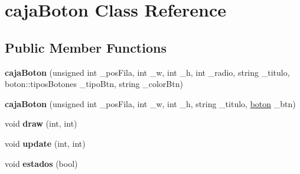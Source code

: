 \hypertarget{classcaja_boton}{}\section{caja\+Boton Class Reference}
\label{classcaja_boton}
\subsection*{Public Member Functions}
\begin{DoxyCompactItemize}
\item 
\hypertarget{classcaja_boton_a989e25ba5f2e1a250034d22aabdefe30}{}{\bfseries caja\+Boton} (unsigned int \+\_\+pos\+Fila, int \+\_\+w, int \+\_\+h, int \+\_\+radio, string \+\_\+titulo, boton\+::tipos\+Botones \+\_\+tipo\+Btn, string \+\_\+color\+Btn)\label{classcaja_boton_a989e25ba5f2e1a250034d22aabdefe30}

\item 
\hypertarget{classcaja_boton_a216275f9afe007fcb60d48ed899bad41}{}{\bfseries caja\+Boton} (unsigned int \+\_\+pos\+Fila, int \+\_\+w, int \+\_\+h, string \+\_\+titulo, \hyperlink{classboton}{boton} \+\_\+btn)\label{classcaja_boton_a216275f9afe007fcb60d48ed899bad41}

\item 
\hypertarget{classcaja_boton_abfaf12f5807f22b90143442ae896afcd}{}void {\bfseries draw} (int, int)\label{classcaja_boton_abfaf12f5807f22b90143442ae896afcd}

\item 
\hypertarget{classcaja_boton_a37cb1ba617e40e4140b079a87fcb239a}{}void {\bfseries update} (int, int)\label{classcaja_boton_a37cb1ba617e40e4140b079a87fcb239a}

\item 
\hypertarget{classcaja_boton_ab51fcdb3e4762a6add779f09ce4c2cb7}{}void {\bfseries estados} (bool)\label{classcaja_boton_ab51fcdb3e4762a6add779f09ce4c2cb7}

\end{DoxyCompactItemize}
